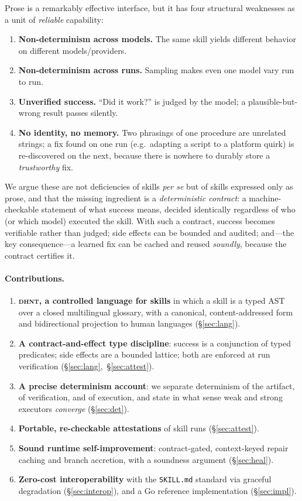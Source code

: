\documentclass[11pt]{article}
\newcommand{\dhnt}{\textsc{dhnt}}
\begin{document}
Prose is a remarkably effective interface, but it has four structural weaknesses
as a unit of \emph{reliable} capability:
\begin{enumerate}[topsep=2pt,itemsep=1pt]
\item \textbf{Non-determinism across models.} The same skill yields different
behavior on different models/providers.
\item \textbf{Non-determinism across runs.} Sampling makes even one model vary
run to run.
\item \textbf{Unverified success.} ``Did it work?'' is judged by the model; a
plausible-but-wrong result passes silently.
\item \textbf{No identity, no memory.} Two phrasings of one procedure are
unrelated strings; a fix found on one run (e.g.\ adapting a script to a platform
quirk) is re-discovered on the next, because there is nowhere to durably store a
\emph{trustworthy} fix.
\end{enumerate}

We argue these are not deficiencies of skills \emph{per se} but of skills
expressed only as prose, and that the missing ingredient is a \emph{deterministic
contract}: a machine-checkable statement of what success means, decided
identically regardless of who (or which model) executed the skill. With such a
contract, success becomes verifiable rather than judged; side effects can be
bounded and audited; and---the key consequence---a learned fix can be cached and
reused \emph{soundly}, because the contract certifies it.

\paragraph{Contributions.}
\begin{enumerate}[topsep=2pt,itemsep=1pt]
\item \textbf{\dhnt{}, a controlled language for skills} in which a skill is a
typed AST over a closed multilingual glossary, with a canonical, content-addressed
form and bidirectional projection to human languages (\S\ref{sec:lang}).
\item \textbf{A contract-and-effect type discipline}: success is a conjunction of
typed predicates; side effects are a bounded lattice; both are enforced at run
verification (\S\ref{sec:lang},~\S\ref{sec:attest}).
\item \textbf{A precise determinism account}: we separate determinism of the
artifact, of verification, and of execution, and state in what sense weak and
strong executors \emph{converge} (\S\ref{sec:det}).
\item \textbf{Portable, re-checkable attestations} of skill runs
(\S\ref{sec:attest}).
\item \textbf{Sound runtime self-improvement}: contract-gated, context-keyed
repair caching and branch accretion, with a soundness argument
(\S\ref{sec:heal}).
\item \textbf{Zero-cost interoperability} with the \texttt{SKILL.md} standard via
graceful degradation (\S\ref{sec:interop}), and a Go reference implementation
(\S\ref{sec:impl}).
\end{enumerate}
\end{document}
